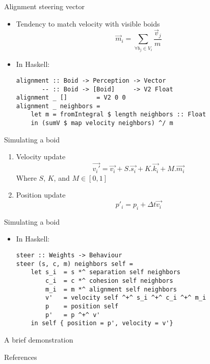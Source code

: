 \documentclass{beamer}
\begin{document}
\begin{frame}[fragile]
    \huge{Alignment steering vector}\normalsize
    \begin{itemize}
    \item Tendency to match velocity with visible boids
    \begin{equation*}
    \vec{m}_i = \sum\limits_{\forall b_j \in V_i} \frac{\vec{v}_j}{m}
    \end{equation*}
    \item<2-> In Haskell:
    \begin{verbatim}
alignment :: Boid -> Perception -> Vector
       -- :: Boid -> [Boid]     -> V2 Float
alignment _ []        = V2 0 0
alignment _ neighbors =
    let m = fromIntegral $ length neighbors :: Float
    in (sumV $ map velocity neighbors) ^/ m
    \end{verbatim}
    \end{itemize}
\end{frame}


\begin{frame}[fragile]
    \huge{Simulating a boid}\normalsize
    \begin{enumerate}
    \item<1-> Velocity update
    \begin{equation*}
    \vec{v_i\prime} = \vec{v_i} + S.\vec{s_i} + K.\vec{k_i} + M.\vec{m_i}
    \end{equation*}
        Where $S$, $K$, and $M \in [0,1]$
    \item<2-> Position update
    \begin{equation*}
    p\prime_i = p_i + \Delta t\vec{v_i}
    \end{equation*}
    \end{enumerate}
\end{frame}

\begin{frame}[fragile]
    \huge{Simulating a boid}\normalsize
    \begin{itemize}
    \item In Haskell:
        \begin{verbatim}
steer :: Weights -> Behaviour
steer (s, c, m) neighbors self =
    let s_i  = s *^ separation self neighbors
        c_i  = c *^ cohesion self neighbors
        m_i  = m *^ alignment self neighbors
        v'   = velocity self ^+^ s_i ^+^ c_i ^+^ m_i
        p    = position self
        p'   = p ^+^ v'
    in self { position = p', velocity = v'}
        \end{verbatim}
    \end{itemize}
\end{frame}

\begin{frame}
    \huge{A brief demonstration}\normalsize
\end{frame}

\begin{frame}
\huge{References}\normalsize
\footnotesize{

 
 
}
\end{frame}
\end{document}
